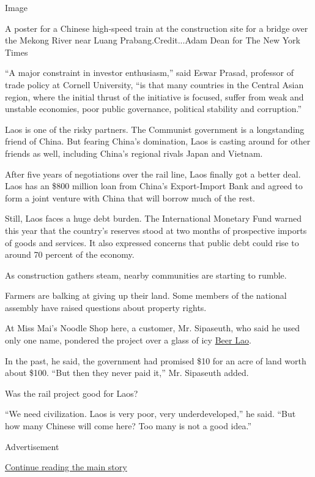 Image

A poster for a Chinese high-speed train at the construction site for a
bridge over the Mekong River near Luang Prabang.Credit...Adam Dean for
The New York Times

``A major constraint in investor enthusiasm,'' said Eswar Prasad,
professor of trade policy at Cornell University, ``is that many
countries in the Central Asian region, where the initial thrust of the
initiative is focused, suffer from weak and unstable economies, poor
public governance, political stability and corruption.''

Laos is one of the risky partners. The Communist government is a
longstanding friend of China. But fearing China's domination, Laos is
casting around for other friends as well, including China's regional
rivals Japan and Vietnam.

After five years of negotiations over the rail line, Laos finally got a
better deal. Laos has an \$800 million loan from China's Export-Import
Bank and agreed to form a joint venture with China that will borrow much
of the rest.

Still, Laos faces a huge debt burden. The International Monetary Fund
warned this year that the country's reserves stood at two months of
prospective imports of goods and services. It also expressed concerns
that public debt could rise to around 70 percent of the economy.

As construction gathers steam, nearby communities are starting to
rumble.

Farmers are balking at giving up their land. Some members of the
national assembly have raised questions about property rights.

At Miss Mai's Noodle Shop here, a customer, Mr. Sipaseuth, who said he
used only one name, pondered the project over a glass of icy
\href{http://www.nytimes3xbfgragh.onion/2009/05/26/business/global/26beer.html}{Beer
Lao}.

In the past, he said, the government had promised \$10 for an acre of
land worth about \$100. ``But then they never paid it,'' Mr. Sipaseuth
added.

Was the rail project good for Laos?

``We need civilization. Laos is very poor, very underdeveloped,'' he
said. ``But how many Chinese will come here? Too many is not a good
idea.''

Advertisement

\protect\hyperlink{after-bottom}{Continue reading the main story}

